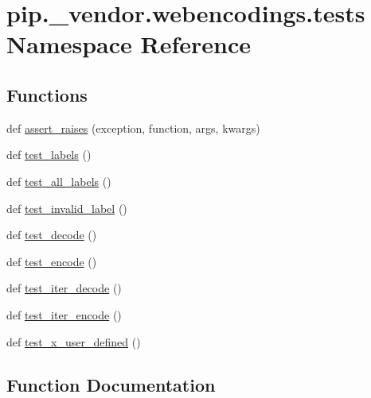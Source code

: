 \hypertarget{namespacepip_1_1__vendor_1_1webencodings_1_1tests}{}\section{pip.\+\_\+vendor.\+webencodings.\+tests Namespace Reference}
\label{namespacepip_1_1__vendor_1_1webencodings_1_1tests}
\subsection*{Functions}
\begin{DoxyCompactItemize}
\item 
def \hyperlink{namespacepip_1_1__vendor_1_1webencodings_1_1tests_ac50d9ce05124aa5a316f753a600d814d}{assert\+\_\+raises} (exception, function, args, kwargs)
\item 
def \hyperlink{namespacepip_1_1__vendor_1_1webencodings_1_1tests_a383f101ac712b9fbfc155e924296a171}{test\+\_\+labels} ()
\item 
def \hyperlink{namespacepip_1_1__vendor_1_1webencodings_1_1tests_a6382f1c5c7589aaeee463753e66f8101}{test\+\_\+all\+\_\+labels} ()
\item 
def \hyperlink{namespacepip_1_1__vendor_1_1webencodings_1_1tests_aafc0af59c48731e29861d376277ee6dd}{test\+\_\+invalid\+\_\+label} ()
\item 
def \hyperlink{namespacepip_1_1__vendor_1_1webencodings_1_1tests_a0a1cbfe3778eaa1e668ffe76257dbfb2}{test\+\_\+decode} ()
\item 
def \hyperlink{namespacepip_1_1__vendor_1_1webencodings_1_1tests_a5edad72ced7959272834ce746f7baaad}{test\+\_\+encode} ()
\item 
def \hyperlink{namespacepip_1_1__vendor_1_1webencodings_1_1tests_ad1ac12554e243016de686af7c4795cdf}{test\+\_\+iter\+\_\+decode} ()
\item 
def \hyperlink{namespacepip_1_1__vendor_1_1webencodings_1_1tests_a2f6cb81cf47dca9856b11083254211a9}{test\+\_\+iter\+\_\+encode} ()
\item 
def \hyperlink{namespacepip_1_1__vendor_1_1webencodings_1_1tests_a51e36716abe0b468aeb3a702efce2820}{test\+\_\+x\+\_\+user\+\_\+defined} ()
\end{DoxyCompactItemize}


\subsection{Function Documentation}
\mbox{\label{namespacepip_1_1__vendor_1_1webencodings_1_1tests_ac50d9ce05124aa5a316f753a600d814d}} 
